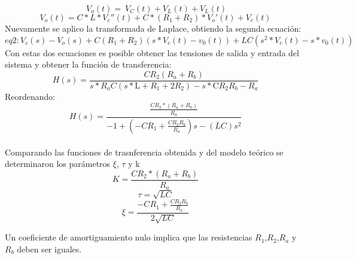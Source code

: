 \documentclass[10pt,a4paper]{article} %
\begin{document}
\begin{equation}
\ V_{o}(t)=\ V_{C}(t)+ V_{L}(t)+ V_{L}(t)
\end{equation}
\begin{equation}
V_{o}(t)=C*L*V_{c}''(t)+ C*(R_{1}+R_{2})*V_{o}'(t)+V_{c}(t)
\end{equation}
Nuevamente se aplico la transformada de Laplace, obtiendo la segunda ecuación:
\begin{equation}
eq2 : V_{c}(s) - V_{o}(s) + C(R_{1} + R_{2})(s*V_{c}(t) - v_{0}(t)) + 
LC(s^{2}*V_{c}(t) - s*v_{0}(t))
\end{equation}
Con estas dos ecuaciones es posible obtener las tensiones de salida y entrada del sistema y obtener la función de transferencia:
\begin{equation}
H(s)=\frac{C R_{2} (R_{a}+R_{b})}{s*R_{a}C (s*\text{L} +R_{1}+2 R_{2})-s*\text{C}R_{2} R_{b} -R_{a}}
\end{equation}
Reordenando:
\begin{equation}
H(s)=\frac{\frac{CR_{2}*(R_{a}+R_{b})}{R_{a}}}{-1+(-CR_{1}+\frac{CR_{2}R_{b}}{R_{a}})s-(LC)s^{2}}
\end{equation}
\\
Comparando las funciones de trasnferencia obtenida y del modelo teórico se determinaron los parámetros $\xi$, $\tau$ y k 
\begin{equation}
K=\frac{CR_{2}*(R_{a}+R_{b})}{R_{a}}
\end{equation}
\begin{equation}
\tau=\sqrt{LC}
\end{equation}
\begin{equation}
\xi=\dfrac{-CR_{1}+\frac{CR_{2}R_{b}}{R_{a}}}{2\sqrt{LC}}
\end{equation}

Un coeficiente de amortiguamiento nulo implica que las resistencias $R_1$,$R_2$,$R_a$ y $R_b$ deben ser iguales. 
\end{document}
